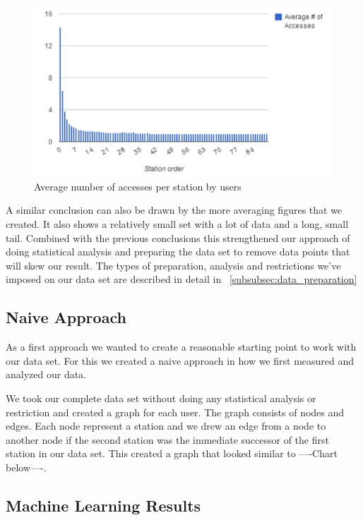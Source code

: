 \begin{figure}[!ht]
	\caption{Average number of accesses per station by users}
	\centering
	\includegraphics[width=1.0\textwidth]{charts/number_stations_average_user}
\end{figure}

A similar conclusion can also be drawn by the more averaging figures that we created. It also shows a relatively small set with a lot of data and a long, small tail. Combined with the previous conclusions this strengthened our approach of doing statistical analysis and preparing the data set to remove data points that will skew our result. The types of preparation, analysis and restrictions we've imposed on our data set are described in detail in ~\ref{subsubsec:data_preparation}

\subsection{Naive Approach}
As a first approach we wanted to create a reasonable starting point to work with our data set. For this we created a naive approach in how we first measured and analyzed our data. 

We took our complete data set without doing any statistical analysis or restriction and created a graph for each user. The graph consists of nodes and edges. Each node represent a station and we drew an edge from a node to another node if the second station was the immediate successor of the first station in our data set. This created a graph that looked similar to ----Chart below----.

\subsection{Machine Learning Results}
\label{subsec:machine_learning_results}

